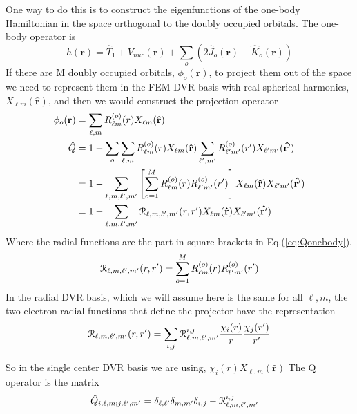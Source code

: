 \documentclass[%
pra%
,twocolumn%
,amssymb, nobibnotes, aps,
longbibliography
]{revtex4-1}
\begin{document}
One way to do this is to construct the eigenfunctions of the one-body Hamiltonian in the space orthogonal to the doubly occupied orbitals. 
The one-body operator is
\begin{equation}
h(\mathbf{r})= \hat{T}_1 + V_{nuc}(\mathbf{r})  + \sum_o \left( 2 \hat{J}_o(\mathbf{r}) - \hat{K}_o(\mathbf{r})  \right) 
\end{equation}
If there are M doubly occupied orbitals, $\phi_o(\mathbf{r})$,  to project them out of the space we need to represent them in the FEM-DVR basis with real spherical harmonics, $X_{\ell m}(\mathbf{\hat{r}})$, and then we would construct the projection operator
\begin{equation}
\begin{split}
\phi_o(\mathbf{r}) &= \sum_{\ell,m} R^{(o)}_{\ell m}(r) X_{\ell m} (  \mathbf{\hat{r}} )\\
\hat{Q}&= 1 - \sum_o \sum_{\ell,m} R^{(o)}_{\ell m}(r) X_{\ell m} (  \mathbf{\hat{r}} ) \sum_{\ell',m'} R^{(o)}_{\ell' m'}(r') X_{\ell' m'} (  \mathbf{\hat{r'}} ) \\
&= 1- \sum_{\ell,m,\ell',m'} \left[\sum_{o=1}^M  R^{(o)}_{\ell m}(r) R^{(o)}_{\ell' m'}(r') \right] X_{\ell m} (  \mathbf{\hat{r}} ) X_{\ell' m'} (  \mathbf{\hat{r'}} ) \\
&= 1- \sum_{\ell,m,\ell',m'}  \EuScript{R}_{\ell,m,\ell',m'} (r,r') X_{\ell m} (  \mathbf{\hat{r}} ) X_{\ell' m'} (  \mathbf{\hat{r'}} )
\end{split}
\label{eq:Qonebody}
\end{equation}
Where the radial functions are the part in square brackets in Eq.(\ref{eq:Qonebody}),
\begin{equation}
\EuScript{R}_{\ell,m,\ell',m'} (r,r') = \sum_{o=1}^M  R^{(o)}_{\ell m}(r) R^{(o)}_{\ell' m'}(r') 
\end{equation}
In the radial DVR basis, which we will assume here is the same for all $\ell, m$, the two-electron radial functions that define the projector have the representation
\begin{equation}
\begin{split}
 \EuScript{R}_{\ell,m,\ell',m'} (r,r') = \sum_{i,j}  \EuScript{R}_{\ell,m,\ell',m'}^{i,j} \frac{\chi_i(r)}{r} \frac{ \chi_j(r') }{r'}
\end{split}
\end{equation}

So in the single center DVR basis we are using, $\chi_i(r) X_{\ell,m} (\mathbf{\hat{r}})$ The Q operator is the matrix
\begin{equation}
\begin{split}
\hat{Q}_{i,\ell,m ;  j, \ell',m'} 
&= \delta_{\ell,\ell'} \delta_{m,m'} \delta_{i,j}  - \EuScript{R}_{\ell,m,\ell',m'}^{i,j} 
\end{split}
\end{equation}
\end{document}
